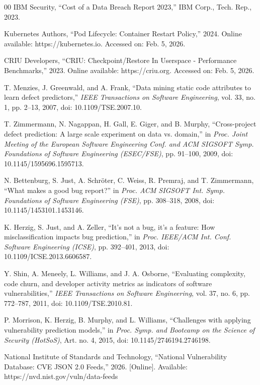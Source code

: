 ﻿\documentclass[lettersize,journal]{IEEEtran}
\begin{document}
\begin{thebibliography}{00}
IBM Security, “Cost of a Data Breach Report 2023,” IBM Corp., Tech. Rep., 2023.

Kubernetes Authors, “Pod Lifecycle: Container Restart Policy,” 2024. Online available: https://kubernetes.io. Accessed on: Feb. 5, 2026.

CRIU Developers, “CRIU: Checkpoint/Restore In Userspace - Performance Benchmarks,” 2023. Online available: https://criu.org. Accessed on: Feb. 5, 2026.

T. Menzies, J. Greenwald, and A. Frank, ``Data mining static code attributes to learn defect predictors,'' \textit{IEEE Transactions on Software Engineering}, vol. 33, no. 1, pp. 2--13, 2007, doi: 10.1109/TSE.2007.10.

T. Zimmermann, N. Nagappan, H. Gall, E. Giger, and B. Murphy, ``Cross-project defect prediction: A large scale experiment on data vs. domain,'' in \textit{Proc. Joint Meeting of the European Software Engineering Conf. and ACM SIGSOFT Symp. Foundations of Software Engineering (ESEC/FSE)}, pp. 91--100, 2009, doi: 10.1145/1595696.1595713.

N. Bettenburg, S. Just, A. Schr\"oter, C. Weiss, R. Premraj, and T. Zimmermann, ``What makes a good bug report?'' in \textit{Proc. ACM SIGSOFT Int. Symp. Foundations of Software Engineering (FSE)}, pp. 308--318, 2008, doi: 10.1145/1453101.1453146.

K. Herzig, S. Just, and A. Zeller, ``It's not a bug, it's a feature: How misclassification impacts bug prediction,'' in \textit{Proc. IEEE/ACM Int. Conf. Software Engineering (ICSE)}, pp. 392--401, 2013, doi: 10.1109/ICSE.2013.6606587.

Y. Shin, A. Meneely, L. Williams, and J. A. Osborne, ``Evaluating complexity, code churn, and developer activity metrics as indicators of software vulnerabilities,'' \textit{IEEE Transactions on Software Engineering}, vol. 37, no. 6, pp. 772--787, 2011, doi: 10.1109/TSE.2010.81.

P. Morrison, K. Herzig, B. Murphy, and L. Williams, ``Challenges with applying vulnerability prediction models,'' in \textit{Proc. Symp. and Bootcamp on the Science of Security (HotSoS)}, Art. no. 4, 2015, doi: 10.1145/2746194.2746198.

National Institute of Standards and Technology, ``National Vulnerability Database: CVE JSON 2.0 Feeds,'' 2026. [Online]. Available: https://nvd.nist.gov/vuln/data-feeds


\end{thebibliography}
\end{document}
